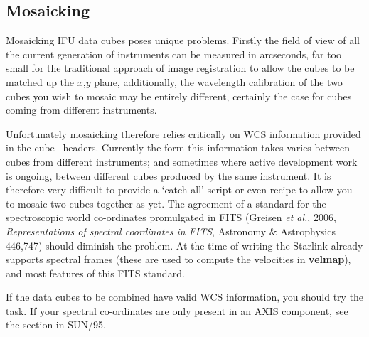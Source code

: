 \documentclass[twoside,11pt]{starlink}
\providecommand{\FITSref}{\htmladdnormallink{FITS}{http://fits.gsfc.nasa.gov/}}
\begin{document}
\begin{small}
\begin{terminalv}
\end{terminalv}
\end{small}

\subsection{Mosaicking\label{sc16_mos}}

Mosaicking IFU data cubes poses unique problems.  Firstly the
field of view of all the current generation of instruments can be
measured in arcseconds, far too small for the traditional approach of
image registration to allow the cubes to be matched up the $x$,$y$
plane, additionally, the wavelength calibration of the two cubes you
wish to mosaic may be entirely different, certainly the case for cubes
coming from different instruments.


Unfortunately mosaicking therefore relies critically on WCS
information provided in the cube \FITSref\ headers.  Currently the
form this information takes varies between cubes from different
instruments; and sometimes where active development work is ongoing,
between different cubes produced by the same instrument.  It is
therefore very difficult to provide a `catch all' script or even
recipe to allow you to mosaic two cubes together as yet.  The
agreement of a standard for the spectroscopic world co-ordinates
promulgated in FITS (Greisen \emph{et al.}, 2006, \emph{Representations
of spectral coordinates in FITS}, Astronomy \& Astrophysics 446,747)
should diminish the problem. At the time of writing the Starlink
 already supports spectral frames (these are used
to compute the velocities in \textbf{velmap}), and most features of this
FITS standard.

If the data cubes to be combined have valid WCS information,
you should try the  task.
If your spectral co-ordinates are only present in an AXIS component,
see the section  in SUN/95.
\end{document}
